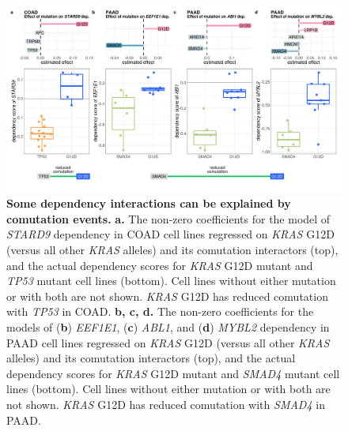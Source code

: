 \documentclass[english, 10pt, letterpaper]{article}
\newcommand{\beginsupplement}{%
        \setcounter{table}{0}
        \renewcommand{\thetable}{\arabic{table}}%
        \setcounter{figure}{0}
        \renewcommand{\thefigure}{\arabic{figure}}%
    }
\newcommand{\KRAS}{\emph{KRAS}}
\begin{document}
\begin{figure}[h!]
\centering
\includegraphics[width=180mm]{figures/Fig_5.jpeg}
\caption{
    \textbf{Some dependency interactions can be explained by comutation events.}
    \textbf{a.} The non-zero coefficients for the model of \emph{STARD9} dependency in COAD cell lines regressed on \KRAS{} G12D (versus all other \KRAS{} alleles) and its comutation interactors (top), and the actual dependency scores for \KRAS{} G12D mutant and \emph{TP53} mutant cell lines (bottom). Cell lines without either mutation or with both are not shown. \KRAS{} G12D has reduced comutation with \emph{TP53} in COAD.
    \textbf{b, c, d.} The non-zero coefficients for the models of (\textbf{b}) \emph{EEF1E1}, (\textbf{c}) \emph{ABL1}, and (\textbf{d}) \emph{MYBL2} dependency in PAAD cell lines regressed on \KRAS{} G12D (versus all other \KRAS{} alleles) and its comutation interactors (top), and the actual dependency scores for \KRAS{} G12D mutant and \emph{SMAD4} mutant cell lines (bottom). Cell lines without either mutation or with both are not shown. \KRAS{} G12D has reduced comutation with \emph{SMAD4} in PAAD.
}
\label{fig:dep-map-comut-masking}
\end{figure}
\newpage




\beginsupplement
\makeatletter
\renewcommand{\fnum@figure}{Supplementary \figurename~\thefigure}
\makeatother
\end{document}
